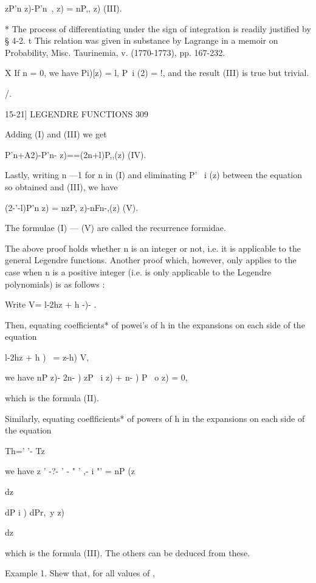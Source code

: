 {zP'n z)-P'n\ , z) = nP,, z) (III).

* The process of differentiating under the sign of integration is
readily justified by § 4-2. t This relation was given in substance by
Lagrange in a memoir on Probability, Misc. Taurinemia, v. (1770-1773),
pp. 167-232.

X If n = 0, we have Pi)[z) = l, P\ i (2) = !, and the result (III) is
true but trivial.



/.



15-21] LEGENDRE FUNCTIONS 309

Adding (I) and (III) we get

P'n+A2)-P'n- z)==(2n+l)P,,(z) (IV).

Lastly, writing n —1 for n in (I) and eliminating P' \ i (z) between
the equation so obtained and (III), we have

(2-'-l)P'n z) = nzP, z)-nFn-,(z) (V).

The formulae (I) — (V) are called the recurrence formidae.

The above proof holds whether n is an integer or not, i.e. it is
applicable to the general Legendre functions. Another proof which,
however, only applies to the case when n is a positive integer (i.e.
is only applicable to the Legendre polynomials) is as follows :

Write V= l-2hz + h -)- .

Then, equating coefficients* of powei's of h in the expansions on each
side of the equation

 l-2hz + h )~ = z-h) V,

we have nP z)- 2n- ) zP \ i z) + n- ) P \ o z) = 0,

which is the formula (II).

Similarly, equating coeflficients* of powers of h in the expansions on
each side of the equation

 Th=' '- Tz



we have z ' -?- ' - " ' ,- i "' = nP (z\

dz



dP i ) dPr,\ y z)

dz



which is the formula (III). The others can be deduced from these.



Example 1. Shew that, for all values of ,

}
